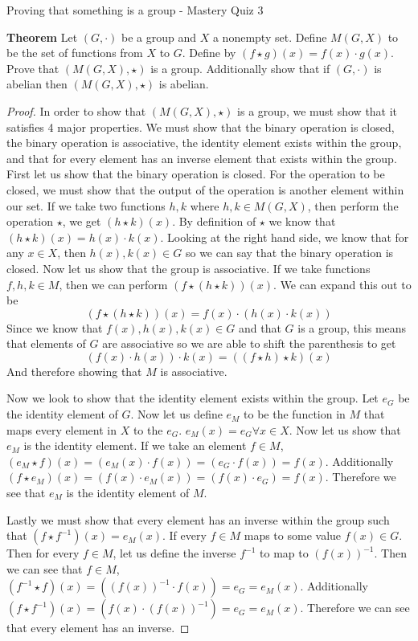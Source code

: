 Proving that something is a group - Mastery Quiz 3

\textbf{Theorem}
Let $(G,·)$ be a group and $X$ a nonempty set.  Define $M(G, X)$ to be the set of functions from $X$ to $G$.  Define by $(f \star g)(x) =f(x)\cdot g(x)$.  Prove that $(M(G, X), \star)$ is a group.  Additionally show that if $(G,·)$ is abelian then $(M(G, X), \star)$ is abelian.

\begin{proof}
In order to show that $(M(G, X), \star)$ is a group, we must show that it satisfies 4 major properties. We must show that the binary operation is closed, the binary operation is associative, the identity element exists within the group, and that for every element has an inverse element that exists within the group.
First let us show that the binary operation is closed. For the operation to be closed, we must show that the output of the operation is another element within our set. If we take two functions $h,k$ where $h,k \in M(G, X)$, then perform the operation $\star$, we get $(h \star k)(x)$. By definition of $\star$ we know that $(h \star k)(x) = h(x) \cdot k(x)$. Looking at the right hand side, we know that for any $x\in X$, then $h(x),k(x) \in G$ so we can say that the binary operation is closed. Now let us show that the group is associative. If we take functions $f,h,k\in M$, then we can perform $(f\star (h \star k))(x)$. We can expand this out to be 
$$(f\star (h \star k))(x) = f(x) \cdot (h(x) \cdot k(x))$$
Since we know that $f(x),h(x),k(x) \in G$ and that $G$ is a group, this means that elements of $G$ are associative so we are able to shift the parenthesis to get 
$$ (f(x) \cdot h(x)) \cdot k(x) = ((f\star h) \star k)(x) $$
And therefore showing that $M$ is associative.

Now we look to show that the identity element exists within the group. Let $e_G$ be the identity element of $G$. Now let us define $e_M$ to be the function in $M$ that maps every element in $X$ to the $e_G$. $e_M(x) = e_G \forall x\in X$. Now let us show that $e_M$ is the identity element. If we take an element $f\in M$, $(e_M \star f) (x) = (e_M(x) \cdot f(x)) = (e_G \cdot f(x)) = f(x)$. Additionally  $(f \star e_M) (x) = (f(x) \cdot e_M(x)) =  (f(x)\cdot e_G ) = f(x)$. Therefore we see that $e_M$ is the identity element of $M$.

Lastly we must show that every element has an inverse within the group such that $(f \star f^{-1}) (x) = e_M(x)$. If every $f\in M$ maps to some value $f(x) \in G$. Then for every $f\in M$, let us define the inverse $f^{-1}$ to map to $(f(x))^{-1}$. Then we can see that $f\in M$, $(f^{-1} \star f) (x) = ((f(x))^{-1} \cdot f(x)) = e_G = e_M(x)$. Additionally  $(f \star f^{-1}) (x) = (f(x) \cdot (f(x))^{-1}) = e_G = e_M(x)$. Therefore we can see that every element has an inverse.


\end{proof}
